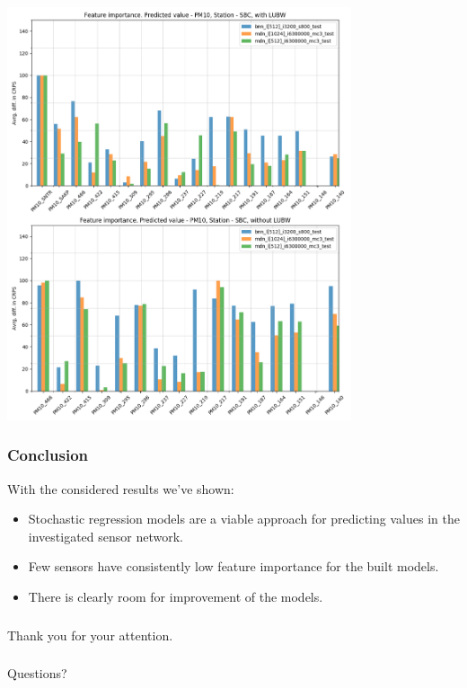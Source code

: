 \documentclass[18pt]{beamer}
\begin{document}
\begin{frame}
  \vspace*{-0.05in}
  \begin{center}
    \includegraphics[height=0.75\textwidth, width=0.76\textwidth]{images/feature_importance_CRPS_SBC_P1}
  \end{center}  
\end{frame}


\begin{frame}[t]
  \frametitle{Conclusion}
  With the considered results we've shown:
  \begin{itemize}
  \item Stochastic regression models are a viable approach for predicting values in the investigated sensor network.
  \item Few sensors have consistently low feature importance for the built models.
  \item There is clearly room for improvement of the models.
  \end{itemize}
  
\end{frame}


\begin{frame}
  \frametitle{}
  \begin{center}
    \huge{Thank you for your attention.}    
  \end{center}
\end{frame}

\begin{frame}
  \frametitle{}
  \begin{center}
    \huge{Questions?}    
  \end{center}
\end{frame}
\end{document}
